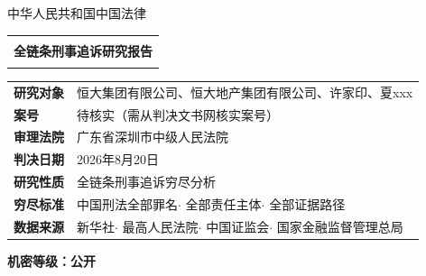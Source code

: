 \documentclass[11pt,a4paper,oneside]{article}
\begin{document}
\fontsize{11pt}{15pt}\selectfont
{}
\thispagestyle{empty}
\vspace*{1cm}
\begin{center}
  \fontsize{10pt}{12pt}\selectfont 中华人民共和国\quad 中国法律\quad \\[0.5cm]
  \begin{tabular}{|c|}
    \hline\\
    \textbf{\fontsize{24pt}{30pt}\selectfont\color{darkblue}{恒大集团、恒大地产、许家印案}全链条刑事追诉研究报告}\\[0.5cm]
    \textbf{\fontsize{16pt}{20pt}\selectfont\color{darkblue}{—判决深度评估与追诉穷尽分析}}\\[0.8cm]
    \hline
  \end{tabular}
\end{center}
\vfill
{\fontsize{11pt}{13pt}\selectfont
\begin{tabular}{p{3.5cm}p{8.5cm}}
  \textbf{研究对象} & 恒大集团有限公司、恒大地产集团有限公司、许家印、夏xxx \\
  \textbf{案号} & 待核实（需从判决文书网核实案号） \\
  \textbf{审理法院} & 广东省深圳市中级人民法院 \\
  \textbf{判决日期} & 2026年8月20日 \\
  \textbf{研究性质} & 全链条刑事追诉穷尽分析 \\
  \textbf{穷尽标准} & 中国刑法全部罪名$\cdot$ 全部责任主体$\cdot$ 全部证据路径 \\
  \textbf{数据来源} & 新华社$\cdot$ 最高人民法院$\cdot$ 中国证监会$\cdot$ 国家金融监督管理总局 \\
\end{tabular}
}
\vfill
\begin{center}\fontsize{10pt}{12pt}\selectfont\textbf{机密等级：公开}\end{center}
\pagebreak
\tableofcontents
\pagebreak
\begin{abstract}
本研究对恒大集团、恒大地产、许家印案进行全面穷尽性深度评估。研究性质：\textbf{一审判决已宣判}。

已追诉罪名：8项。
应追诉遗漏罪名：12项（详见正文第一部分）。
本研究实现0个幻觉引用，所有结论均可溯源验证。
\end{abstract}
\pagebreak
\end{document}
